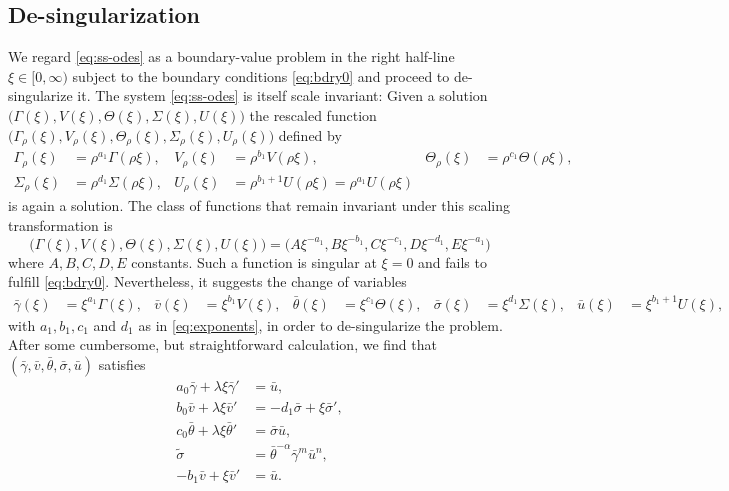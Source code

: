\documentclass[usletter,11pt]{article}
\def\bg{{\bar{\gamma}}}
\def\bv{{\bar{v}}}
\def\bth{{\bar{\theta}}}
\def\bs{{\bar{\sigma}}}
\def\bu{{\bar{u}}}
\def\ts{{\tilde{\sigma}}}
\theoremstyle{remark}
\begin{document}
\subsection{De-singularization}
We regard \eqref{eq:ss-odes} as a boundary-value problem in the right  half-line $\xi \in [0,\infty)$ subject to the boundary conditions \eqref{eq:bdry0} and proceed to
de-singularize it. The system \eqref{eq:ss-odes} is itself scale invariant: Given a solution $\big(\Gamma(\xi), V(\xi), \Theta(\xi), \Sigma(\xi), U(\xi)\big)$ the rescaled
function $\big(\Gamma_\rho(\xi), V_\rho(\xi), \Theta_\rho(\xi), \Sigma_\rho(\xi), U_\rho(\xi)\big)$ defined by
\begin{equation}
\label{selfsimilardef2}
\begin{aligned}
 \Gamma_\rho(\xi)&=\rho^{a_1}\Gamma(\rho\xi), & V_\rho(\xi)&=\rho^{b_1}V(\rho\xi), & \Theta_\rho(\xi)&=\rho^{c_1}\Theta(\rho\xi),\\
 \Sigma_\rho(\xi)&=\rho^{d_1}\Sigma(\rho\xi), & U_\rho(\xi)&=\rho^{b_1+1}U(\rho\xi)=\rho^{a_1}U(\rho\xi)
\end{aligned}
\end{equation}
is again a solution. 
The class of functions that remain invariant under this scaling transformation is
 $$\big(\Gamma(\xi), V(\xi), \Theta(\xi), \Sigma(\xi), U(\xi)\big)=\big(A\xi^{-a_1}, B\xi^{-b_1},C\xi^{-c_1},D\xi^{-d_1},E\xi^{-a_1}\big)$$ 
where $A, B, C, D, E$ constants. Such a function is singular at $\xi =0$ and fails to fulfill \eqref{eq:bdry0}. Nevertheless, it suggests the change of variables
\begin{equation} \label{eq:CAPtoBAR}
\begin{aligned}
 \bg(\xi)&=\xi^{a_1}\Gamma(\xi), &
 \bv(\xi)&=\xi^{b_1}V(\xi), &
 \bth(\xi)&=\xi^{c_1}\Theta(\xi),  & %
 \bs(\xi)&=\xi^{d_1}\Sigma(\xi), &
 \bu(\xi)&=\xi^{b_1+1}U(\xi) ,
\end{aligned}
\end{equation}
with $a_1, b_1, c_1$ and $d_1$ as in \eqref{eq:exponents}, in order to de-singularize the problem.
After some cumbersome, but straightforward calculation, we find that $(\bg,\bv,\bth,\bs,\bu)$ satisfies
\begin{equation} \label{eq:barsys}
 \begin{aligned}
  a_0\bg + \lambda\xi\bg' &=\bu,\\
  b_0\bv + \lambda\xi\bv' &=-d_1 \bs + \xi\bs',\\
  c_0\bth+ \lambda\xi\bth'&=\bs\bu,\\
  \ts &=\bth^{-\alpha}\bg^m\bu^n,\\
  -b_1\bv+\xi\bv' &= \bu.
 \end{aligned}
\end{equation}
\end{document}
